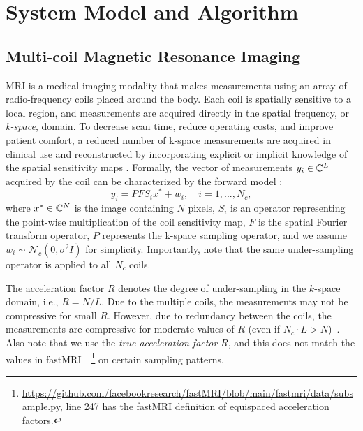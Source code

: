 \section{System Model and Algorithm}

\subsection{Multi-coil Magnetic Resonance Imaging}
MRI is a medical imaging modality that makes measurements using an array of radio-frequency coils placed around the body. Each coil is spatially sensitive to a local region, and measurements are acquired directly in the spatial frequency, or \textit{k-space}, domain.
To decrease scan time, reduce operating costs, and improve patient comfort, a reduced number of k-space measurements are acquired in clinical use and reconstructed by incorporating explicit or implicit knowledge of the spatial sensitivity maps \cite{sodickson1997simultaneous,pruessmann1999sense,griswold2002grappa}. 
Formally, the vector of measurements $y_i \in \mathbb{C}^L$ acquired by the  coil can be characterized by the forward model \cite{pruessmann1999sense}:
\begin{equation}
    y_i = P F S_i x^* + w_i,\quad i=1,...,N_c,
    \label{eq:mri_model}
\end{equation}
\noindent where $x^* \in \mathbb{C}^N$  is the image containing $N$ pixels, $S_i$ is an operator representing the point-wise multiplication of the  coil sensitivity map, $F$ is the spatial Fourier transform operator, $P$ represents the k-space sampling operator, and we assume $w_i \sim \mathcal{N}_c\left(0, \sigma^2I\right)$ for simplicity. Importantly, note that the same under-sampling operator is applied to all $N_c$ coils. 

The acceleration factor $R$ denotes the degree of under-sampling in the $k$-space domain, i.e., $R = N / L$.  
Due to the multiple coils, the measurements may not be compressive for small $R$. However, due to redundancy between the coils, the measurements are compressive for moderate values of $R$ (even if $N_c \cdot L > N$)~\cite{huang2008software}.
Also note that we use the \emph{true acceleration factor} $R$, and this does not match the values in fastMRI~\cite{knoll2020fastmri}~\footnote{\url{https://github.com/facebookresearch/fastMRI/blob/main/fastmri/data/subsample.py}, line 247 has the fastMRI definition of equispaced acceleration factors.} on certain sampling patterns.

